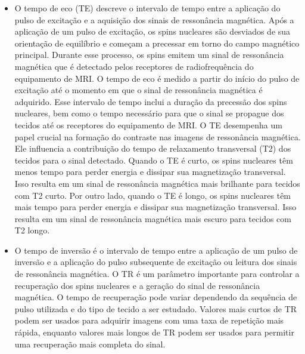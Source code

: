 \documentclass[11pt,a4paper]{article}
\newcounter{exemplo}
\begin{document}
\begin{exemplo}
\begin{itemize}
        \item O tempo de eco (TE) descreve o intervalo de tempo entre a aplicação do pulso de excitação e a aquisição dos sinais de ressonância magnética. Após a aplicação de um pulso de excitação, os spins nucleares são desviados de sua orientação de equilíbrio e começam a precessar em torno do campo magnético principal. Durante esse processo, os spins emitem um sinal de ressonância magnética que é detectado pelos receptores de radiofrequência do equipamento de MRI. O tempo de eco é medido a partir do início do pulso de excitação até o momento em que o sinal de ressonância magnética é adquirido. Esse intervalo de tempo inclui a duração da precessão dos spins nucleares, bem como o tempo necessário para que o sinal se propague dos tecidos até os receptores do equipamento de MRI. O TE desempenha um papel crucial na formação do contraste nas imagens de ressonância magnética. Ele influencia a contribuição do tempo de relaxamento transversal (T2) dos tecidos para o sinal detectado. Quando o TE é curto, os spins nucleares têm menos tempo para perder energia e dissipar sua magnetização transversal. Isso resulta em um sinal de ressonância magnética mais brilhante para tecidos com T2 curto. Por outro lado, quando o TE é longo, os spins nucleares têm mais tempo para perder energia e dissipar sua magnetização transversal. Isso resulta em um sinal de ressonância magnética mais escuro para tecidos com T2 longo.
        
        \item O tempo de inversão é o intervalo de tempo entre a aplicação de um pulso de inversão e a aplicação do pulso subsequente de excitação ou leitura dos sinais de ressonância magnética. O TR é um parâmetro importante para controlar a recuperação dos spins nucleares e a geração do sinal de ressonância magnética. O tempo de recuperação pode variar dependendo da sequência de pulso utilizada e do tipo de tecido a ser estudado. Valores mais curtos de TR podem ser usados para adquirir imagens com uma taxa de repetição mais rápida, enquanto valores mais longos de TR podem ser usados para permitir uma recuperação mais completa do sinal.
        

\end{itemize}
\end{exemplo}
\end{document}
